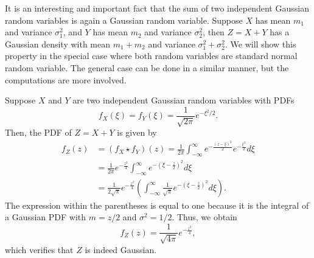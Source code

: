 \begin{example}
It is an interesting and important fact that the sum of two independent Gaussian random variables is again a Gaussian random variable.
Suppose $X$ has mean $m_1$ and variance $\sigma_1^2$, and $Y$ has mean $m_2$ and variance $\sigma_2^2$, then $Z = X + Y$ has a Gaussian density with mean $m_1 + m_2$ and variance $\sigma_1^2 + \sigma_2^2$.
We will show this property in the special case where both random variables are standard normal random variable.
The general case can be done in a similar manner, but the computations are more involved.

Suppose $X$ and $Y$ are two independent Gaussian random variables with PDFs
\begin{equation*}
f_X(\xi) = f_Y(\xi) = \frac 1{\sqrt{2\pi}} e^{-\xi^2/2} .
\end{equation*}
Then, the PDF of $Z = X + Y$ is given by
\begin{equation*}
\begin{split}
f_Z (z) &= (f_X \star f_Y) (z)
= \frac{1}{2\pi}
\int_{-\infty}^{\infty} e^{-\frac{(z - \xi)^2}{2}} e^{-\frac{\xi^2}{2}} d\xi \\
&= \frac{1}{2\pi} e^{- \frac{z^2}{4}}
\int_{-\infty}^{\infty} e^{- \left( \xi - \frac{z}{2} \right)^2} d\xi \\
&= \frac{1}{2 \sqrt{\pi}} e^{- \frac{z^2}{4}}
\left( \int_{-\infty}^{\infty} \frac{1}{\sqrt{\pi}}
e^{-\left( \xi - \frac{z}{2} \right)^2} d\xi \right) .
\end{split}
\end{equation*}
The expression within the parentheses is equal to one because it is the integral of a Gaussian PDF with $m = z/2$ and $\sigma^2 = 1/2$.
Thus, we obtain
\begin{equation*}
f_Z(z) = \frac{1}{\sqrt{4\pi}} e^{-\frac{z^2}{4}} ,
\end{equation*}
which verifies that $Z$ is indeed Gaussian.
\end{example}

